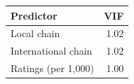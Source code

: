 \begin{tabular}{lr}
\toprule
Predictor & VIF \\
\midrule
Local chain & 1.02 \\
International chain & 1.02 \\
Ratings (per 1,000) & 1.00 \\
\bottomrule
\end{tabular}
